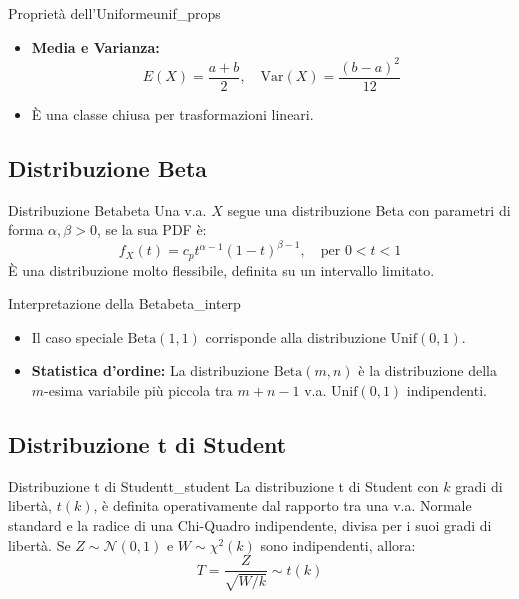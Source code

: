 \begin{proposizione}{Proprietà dell'Uniforme}{unif_props}
\begin{itemize}
    \item \textbf{Media e Varianza:}
    \[ E(X) = \frac{a+b}{2}, \quad \text{Var}(X) = \frac{(b-a)^2}{12} \]
    \item È una classe chiusa per trasformazioni lineari.
\end{itemize}
\end{proposizione}

\subsection{Distribuzione Beta}

\begin{definizione}{Distribuzione Beta}{beta}
Una v.a. \(X\) segue una distribuzione Beta con parametri di forma \(\alpha, \beta > 0\), se la sua PDF è:
\[
f_X(t) = c_p t^{\alpha-1}(1-t)^{\beta-1}, \quad \text{per } 0 < t < 1 \text{}
\]
È una distribuzione molto flessibile, definita su un intervallo limitato.
\end{definizione}

\begin{nota}{Interpretazione della Beta}{beta_interp}
\begin{itemize}
    \item Il caso speciale \(\text{Beta}(1,1)\) corrisponde alla distribuzione \(\text{Unif}(0,1)\).
    \item \textbf{Statistica d'ordine:} La distribuzione \(\text{Beta}(m,n)\) è la distribuzione della \(m\)-esima variabile più piccola tra \(m+n-1\) v.a. \(\text{Unif}(0,1)\) indipendenti.
\end{itemize}
\end{nota}

\subsection{Distribuzione t di Student}

\begin{definizione}{Distribuzione t di Student}{t_student}
La distribuzione t di Student con \(k\) gradi di libertà, \(t(k)\), è definita operativamente dal rapporto tra una v.a. Normale standard e la radice di una Chi-Quadro indipendente, divisa per i suoi gradi di libertà.
Se \(Z \sim \mathcal{N}(0,1)\) e \(W \sim \chi^2(k)\) sono indipendenti, allora:
\[
T = \frac{Z}{\sqrt{W/k}} \sim t(k) \text{}
\]
\end{definizione}

